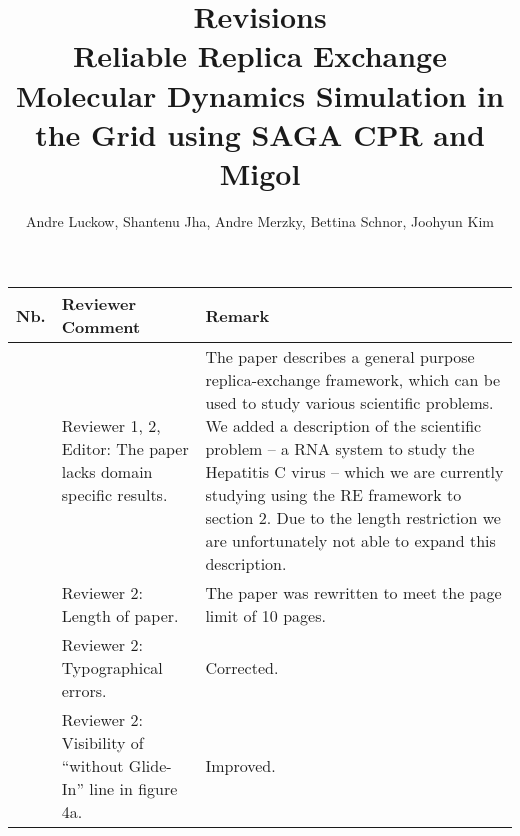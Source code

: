\documentclass[]{article}
\title{\textbf{Revisions}\\Reliable Replica Exchange Molecular Dynamics Simulation in the Grid using SAGA CPR 
and Migol}
\author{Andre Luckow, Shantenu Jha, Andre Merzky, Bettina Schnor, Joohyun Kim}
\newcounter{mycounter}
\newcommand{\COUNTER}{\addtocounter{mycounter}{1} \arabic{mycounter}}
\begin{document}
\maketitle


\begin{longtable}{|p{}|p{}|p{}|}
\hline 

\textbf{Nb.} &\textbf{Reviewer Comment} &\textbf{Remark} \\
\hline
\endhead
\COUNTER&

Reviewer 1, 2, Editor: The paper lacks domain specific results.

&The paper describes a general purpose replica-exchange framework,
which can be used to study various scientific problems. We added a
description of the scientific problem -- a RNA system to study the
Hepatitis C virus -- which we are currently studying using the RE
framework to section 2. Due to the length restriction we are
unfortunately not able to expand this description.\\
 
\hline
\COUNTER&

Reviewer 2: Length of paper.

&The paper was rewritten to meet the page limit of 10 pages.\\
\hline
\COUNTER&

Reviewer 2: Typographical errors.

&Corrected.\\
\hline
\COUNTER&

Reviewer 2: Visibility of ``without Glide-In'' line in figure 4a.

&Improved.\\
\hline

\end{longtable} 
\end{document}
